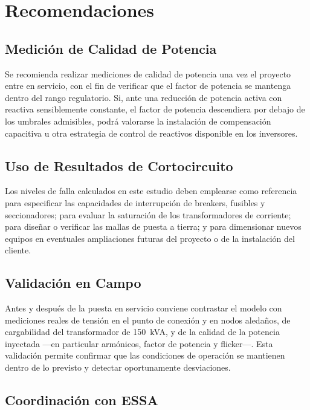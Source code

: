 \section{Recomendaciones}

\subsection{Medición de Calidad de Potencia}

Se recomienda realizar mediciones de calidad de potencia una vez el proyecto entre en servicio, con el fin de verificar que el factor de potencia se mantenga dentro del rango regulatorio. Si, ante una reducción de potencia activa con reactiva sensiblemente constante, el factor de potencia descendiera por debajo de los umbrales admisibles, podrá valorarse la instalación de compensación capacitiva u otra estrategia de control de reactivos disponible en los inversores.

\subsection{Uso de Resultados de Cortocircuito}

Los niveles de falla calculados en este estudio deben emplearse como referencia para especificar las capacidades de interrupción de breakers, fusibles y seccionadores; para evaluar la saturación de los transformadores de corriente; para diseñar o verificar las mallas de puesta a tierra; y para dimensionar nuevos equipos en eventuales ampliaciones futuras del proyecto o de la instalación del cliente.

\subsection{Validación en Campo}

Antes y después de la puesta en servicio conviene contrastar el modelo con mediciones reales de tensión en el punto de conexión y en nodos aledaños, de cargabilidad del transformador de 150~kVA, y de la calidad de la potencia inyectada ---en particular armónicos, factor de potencia y flicker---. Esta validación permite confirmar que las condiciones de operación se mantienen dentro de lo previsto y detectar oportunamente desviaciones.

\subsection{Coordinación con ESSA}

